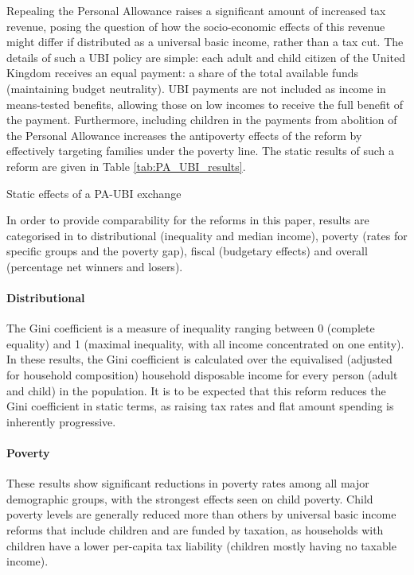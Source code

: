 \documentclass{article}
\begin{document}
    Repealing the Personal Allowance raises a significant amount of increased tax revenue, posing the question of how the socio-economic effects of this revenue might differ if distributed as a universal basic income, rather than a tax cut. The details of such a UBI policy are simple: each adult and child citizen of the United Kingdom receives an equal payment: a share of the total available funds (maintaining budget neutrality). UBI payments are not included as income in means-tested benefits, allowing those on low incomes to receive the full benefit of the payment. Furthermore, including children in the payments from abolition of the Personal Allowance increases the antipoverty effects of the reform by effectively targeting families under the poverty line.\cite{ines} The static results of such a reform are given in Table \ref{tab:PA_UBI_results}.
    \begin{table}
        \centering
        
        \caption{Static effects of a PA-UBI exchange}
        \label{tab:PA_UBI_results}
    \end{table}
    
    In order to provide comparability for the reforms in this paper, results are categorised in to distributional (inequality and median income), poverty (rates for specific groups and the poverty gap), fiscal (budgetary effects) and overall (percentage net winners and losers). 
    
    \paragraph{Distributional} The Gini coefficient is a measure of inequality ranging between 0 (complete equality) and 1 (maximal inequality, with all income concentrated on one entity). In these results, the Gini coefficient is calculated over the equivalised (adjusted for household composition) household disposable income for every person (adult and child) in the population. It is to be expected that this reform reduces the Gini coefficient in static terms, as raising tax rates and flat amount spending is inherently progressive.
    
    \paragraph{Poverty} These results show significant reductions in poverty rates among all major demographic groups, with the strongest effects seen on child poverty. Child poverty levels are generally reduced more than others by universal basic income reforms that include children and are funded by taxation, as households with children have a lower per-capita tax liability (children mostly having no taxable income). 
    
\end{document}

